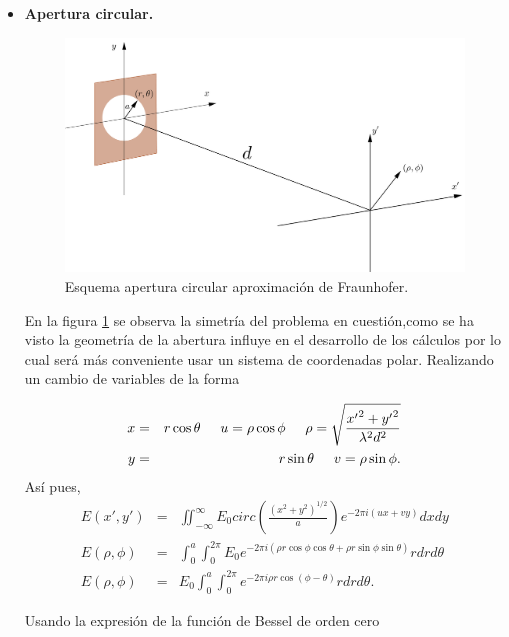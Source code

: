 \begin{itemize}
    \item \textbf{Apertura circular.}\\
    
    \begin{figure}[H]
    \centering
    \includegraphics[width=0.75\linewidth]{Kap1/apertura_circ.png}
    \caption{Esquema  apertura circular aproximación de Fraunhofer.} 
    \label{esq_circular}
    \end{figure}
    
    En la figura \ref{esq_circular} se observa la simetría del problema en cuestión,como se ha visto la geometría de la abertura influye en el desarrollo de los cálculos por lo cual será más conveniente usar un sistema de coordenadas polar. Realizando un cambio de variables de la forma
    
    \begin{eqnarray}
        x&=&r\cos{\theta} \hspace{5mm} u=\rho \cos{\phi} \hspace{5mm} \rho = \sqrt{\frac{{x'}^2+{y'}^2}{\lambda ^2 d^2}}\\
        y&=&r\sin{\theta} \hspace{5mm} v=\rho \sin{\phi}.
    \end{eqnarray}
    Así pues,
    \begin{eqnarray}
        E(x',y')&=&\iint_{-\infty}^{\infty} E_0 circ\left( \frac{(x^2+y^2)^{1/2}}{a} \right) e^{-2\pi i(ux+vy)} dx dy\\
        E(\rho,\phi)&=& \int_{0}^{a} \int_{0}^{2\pi} E_0 e^{-2\pi i(\rho r \cos{\phi}\cos{\theta}+\rho r \sin{\phi}\sin{\theta})}rdrd\theta \\
        E(\rho,\phi)&=&E_0\int_{0}^{a} \int_{0}^{2\pi}e^{-2\pi i\rho r \cos{(\phi - \theta)}}rdrd\theta.
    \end{eqnarray}
    
    Usando la expresión de la función de Bessel de orden cero
    

\end{itemize}
